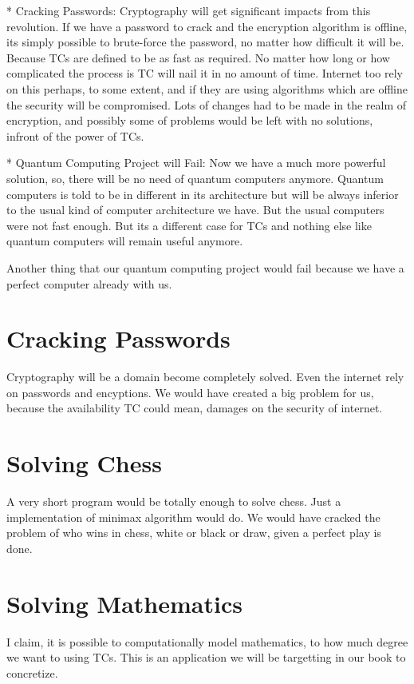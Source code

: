 \documentclass{book}
\begin{document}
* Cracking Passwords: Cryptography will get significant impacts from this revolution. If we have a password to crack and the encryption algorithm is offline, its simply possible to brute-force the password, no matter how difficult it will be. Because TCs are defined to be as fast as required. No matter how long or how complicated the process is TC will nail it in no amount of time. Internet too rely on this perhaps, to some extent, and if they are using algorithms which are offline the security will be compromised. Lots of changes had to be made in the realm of encryption, and possibly some of problems would be left with no solutions, infront of the power of TCs.

* Quantum Computing Project will Fail: Now we have a much more powerful solution, so, there will be no need of quantum computers anymore. Quantum computers is told to be in different in its architecture but will be always inferior to the usual kind of computer architecture we have. But the usual computers were not fast enough. But its a different case for TCs and nothing else like quantum computers will remain useful anymore.

Another thing that our quantum computing project would fail because we have a perfect computer already with us.

\section{Cracking Passwords}
Cryptography will be a domain become completely solved. Even the internet rely on passwords and encyptions. We would have created a big problem for us, because the availability TC could mean, damages on the security of internet. 

\section{Solving Chess}
A very short program would be totally enough to solve chess. Just a implementation of minimax algorithm would do. We would have cracked the problem of who wins in chess, white or black or draw, given a perfect play is done.

\section{Solving Mathematics}
I claim, it is possible to computationally model mathematics, to how much degree we want to using TCs. This is an application we will be targetting in our book to concretize.
\end{document}
